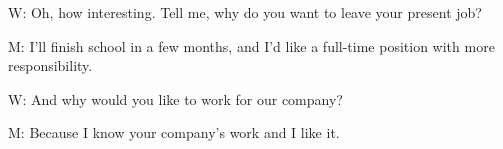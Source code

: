 \documentclass[12pt]{article}
\begin{document}
\vspace{0.00mm}

\vspace{0.00mm}
\setlength{\parindent}{0.00mm}
\setlength{\leftskip}{-6.23mm}
\setlength{\rightskip}{0.00mm}

W: Oh, how interesting. Tell me, why do you want to leave your present job?
\vspace{0.00mm}

\vspace{0.00mm}
\setlength{\parindent}{0.00mm}
\setlength{\leftskip}{-6.23mm}
\setlength{\rightskip}{0.00mm}


\vspace{0.00mm}

\vspace{0.00mm}
\setlength{\parindent}{0.00mm}
\setlength{\leftskip}{-6.23mm}
\setlength{\rightskip}{0.00mm}

M: I'll finish school in a few months, and I'd like a full-time position with more responsibility.
\vspace{0.00mm}

\vspace{0.00mm}
\setlength{\parindent}{0.00mm}
\setlength{\leftskip}{-6.23mm}
\setlength{\rightskip}{0.00mm}


\vspace{0.00mm}

\vspace{0.00mm}
\setlength{\parindent}{0.00mm}
\setlength{\leftskip}{-6.23mm}
\setlength{\rightskip}{0.00mm}

W: And why would you like to work for our company?
\vspace{0.00mm}

\vspace{0.00mm}
\setlength{\parindent}{0.00mm}
\setlength{\leftskip}{-6.23mm}
\setlength{\rightskip}{0.00mm}


\vspace{0.00mm}

\vspace{0.00mm}
\setlength{\parindent}{0.00mm}
\setlength{\leftskip}{-6.23mm}
\setlength{\rightskip}{0.00mm}

M: Because I know your company's work and I like it.
\vspace{0.00mm}

\vspace{0.00mm}
\setlength{\parindent}{0.00mm}
\setlength{\leftskip}{-6.23mm}
\setlength{\rightskip}{0.00mm}


\vspace{0.00mm}
\end{document}
